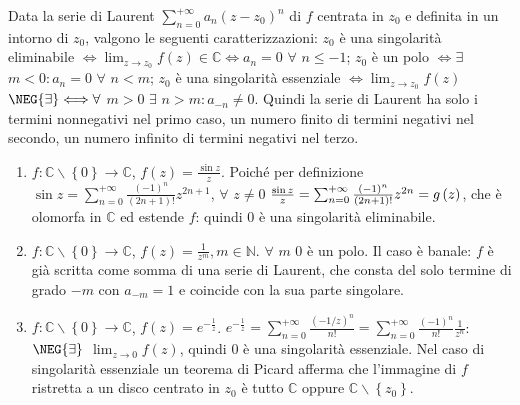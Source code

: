 \documentclass{article}
\begin{document}
Data la serie di Laurent $\sum_{n=0}^{+\infty }a_{n}\left( z-z_{0}\right)
^{n}$ di $f$ centrata in $z_{0}$ e definita in un intorno di $z_{0}$,
valgono le seguenti caratterizzazioni: $z_{0}$ \`{e} una singolarit\`{a}
eliminabile $\Longleftrightarrow \lim_{z\rightarrow z_{0}}f\left( z\right)
\in 
\mathbb{C}
\Longleftrightarrow a_{n}=0$ $\forall $ $n\leq -1$; $z_{0}$ \`{e} un polo $%
\Longleftrightarrow \exists $ $m<0:a_{n}=0$ $\forall $ $n<m$; $z_{0}$ \`{e}
una singolarit\`{a} essenziale $\Longleftrightarrow \lim_{z\rightarrow
z_{0}}f\left( z\right) $ $\NEG{\exists}\Longleftrightarrow \forall $ $m>0$ $%
\exists $ $n>m:a_{-n}\neq 0$. Quindi la serie di Laurent ha solo i termini
nonnegativi nel primo caso, un numero finito di termini negativi nel
secondo, un numero infinito di termini negativi nel terzo.

\begin{enumerate}
\item $f:%
\mathbb{C}
\backslash \left\{ 0\right\} \rightarrow 
\mathbb{C}
$, $f\left( z\right) =\frac{\sin z}{z}$. Poich\'{e} per definizione $\sin
z=\sum_{n=0}^{+\infty }\frac{\left( -1\right) ^{n}}{\left( 2n+1\right) !}%
z^{2n+1}$, $\forall $ $z\neq 0$ $\frac{\sin z}{z}=\sum_{n=0}^{+\infty }\frac{%
\left( -1\right) ^{n}}{\left( 2n+1\right) !}z^{2n}=g\left( z\right) $, che 
\`{e} olomorfa in $%
\mathbb{C}
$ ed estende $f$: quindi $0$ \`{e} una singolarit\`{a} eliminabile.

\item $f:%
\mathbb{C}
\backslash \left\{ 0\right\} \rightarrow 
\mathbb{C}
$, $f\left( z\right) =\frac{1}{z^{m}},m\in 
\mathbb{N}
$. $\forall $ $m$ $0$ \`{e} un polo. Il caso \`{e} banale: $f$ \`{e} gi\`{a}
scritta come somma di una serie di Laurent, che consta del solo termine di
grado $-m$ con $a_{-m}=1$ e coincide con la sua parte singolare.

\item $f:%
\mathbb{C}
\backslash \left\{ 0\right\} \rightarrow 
\mathbb{C}
$, $f\left( z\right) =e^{-\frac{1}{z}}$. $e^{-\frac{1}{z}}=\sum_{n=0}^{+%
\infty }\frac{\left( -1/z\right) ^{n}}{n!}=\sum_{n=0}^{+\infty }\frac{\left(
-1\right) ^{n}}{n!}\frac{1}{z^{n}}$: $\NEG{\exists}$ $\lim_{z\rightarrow
0}f\left( z\right) $, quindi $0$ \`{e} una singolarit\`{a} essenziale. Nel
caso di singolarit\`{a} essenziale un teorema di Picard afferma che
l'immagine di $f$ ristretta a un disco centrato in $z_{0}$ \`{e} tutto $%
\mathbb{C}
$ oppure $%
\mathbb{C}
\backslash \left\{ z_{0}\right\} $.
\end{enumerate}
\end{document}
